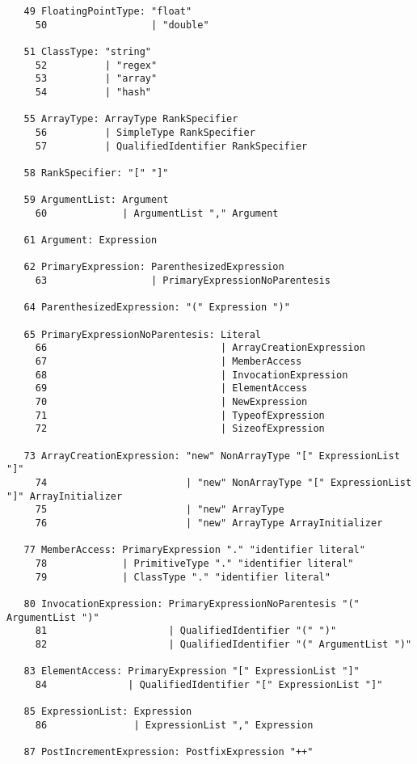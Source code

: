 \begin{espacosimples}
\begin{scriptsize}
\begin{lstlisting}
   49 FloatingPointType: "float"
     50                  | "double"
  
   51 ClassType: "string"
     52          | "regex"
     53          | "array"
     54          | "hash"
  
   55 ArrayType: ArrayType RankSpecifier
     56          | SimpleType RankSpecifier
     57          | QualifiedIdentifier RankSpecifier
  
   58 RankSpecifier: "[" "]"
  
   59 ArgumentList: Argument
     60             | ArgumentList "," Argument
  
   61 Argument: Expression
  
   62 PrimaryExpression: ParenthesizedExpression
     63                  | PrimaryExpressionNoParentesis
  
   64 ParenthesizedExpression: "(" Expression ")"
  
   65 PrimaryExpressionNoParentesis: Literal
     66                              | ArrayCreationExpression
     67                              | MemberAccess
     68                              | InvocationExpression
     69                              | ElementAccess
     70                              | NewExpression
     71                              | TypeofExpression
     72                              | SizeofExpression
  
   73 ArrayCreationExpression: "new" NonArrayType "[" ExpressionList "]"
     74                        | "new" NonArrayType "[" ExpressionList "]" ArrayInitializer
     75                        | "new" ArrayType
     76                        | "new" ArrayType ArrayInitializer
  
   77 MemberAccess: PrimaryExpression "." "identifier literal"
     78             | PrimitiveType "." "identifier literal"
     79             | ClassType "." "identifier literal"
  
   80 InvocationExpression: PrimaryExpressionNoParentesis "(" ArgumentList ")"
     81                     | QualifiedIdentifier "(" ")"
     82                     | QualifiedIdentifier "(" ArgumentList ")"
  
   83 ElementAccess: PrimaryExpression "[" ExpressionList "]"
     84              | QualifiedIdentifier "[" ExpressionList "]"
  
   85 ExpressionList: Expression
     86               | ExpressionList "," Expression
  
   87 PostIncrementExpression: PostfixExpression "++"
  

\end{lstlisting}
\end{scriptsize}
\end{espacosimples}
